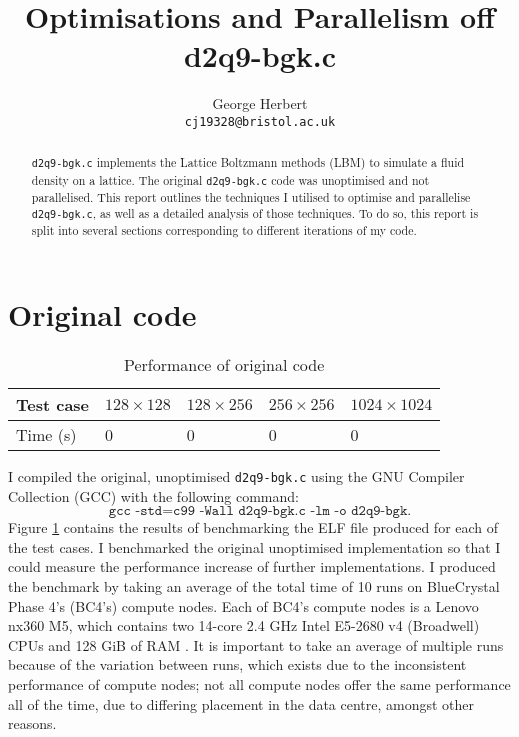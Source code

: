 \documentclass[11pt, a4paper]{article}
\author{
    George Herbert\\
    \texttt{cj19328@bristol.ac.uk}
}
\title{Optimisations and Parallelism off d2q9-bgk.c}
\begin{document}
\maketitle

\begin{abstract}
    \texttt{d2q9-bgk.c} implements the Lattice Boltzmann methods (LBM) to simulate a fluid density on a lattice.
    The original \texttt{d2q9-bgk.c} code was unoptimised and not parallelised.
    This report outlines the techniques I utilised to optimise and parallelise \texttt{d2q9-bgk.c}, as well as a detailed analysis of those techniques.
    To do so, this report is split into several sections corresponding to different iterations of my code.
\end{abstract}

\section{Original code}

\begin{table}[htbp]
    \begin{center}
    \caption{Performance of original code}\label{tab:original}
    \begin{tabular}{l | l l l l} 
        \hline\hline
        Test case&$128 \times 128$&$128 \times 256$&$256 \times 256$&$1024 \times 1024$\\
        \hline
        Time (s)&0&0&0&0\\
        \hline
      \end{tabular}
    \end{center}
\end{table} 

I compiled the original, unoptimised \texttt{d2q9-bgk.c} using the GNU Compiler Collection (GCC) with the following command:
\[
    \texttt{gcc -std=c99 -Wall d2q9-bgk.c -lm -o d2q9-bgk}.
\]
Figure \ref{tab:original} contains the results of benchmarking the ELF file produced for each of the test cases.
I benchmarked the original unoptimised implementation so that I could measure the performance increase of further implementations.
I produced the benchmark by taking an average of the total time of 10 runs on BlueCrystal Phase 4's (BC4's) compute nodes.
Each of BC4's compute nodes is a Lenovo nx360 M5, which contains two 14-core 2.4 GHz Intel E5-2680 v4 (Broadwell) CPUs and 128 GiB of RAM \cite{bcp4}.
It is important to take an average of multiple runs because of the variation between runs, which exists due to the inconsistent performance of compute nodes; not all compute nodes offer the same performance all of the time, due to differing placement in the data centre, amongst other reasons.
\end{document}
